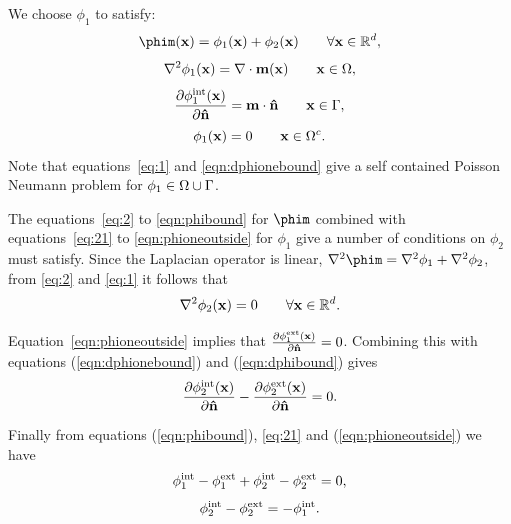 We choose $\phi_1$ to satisfy:
\begin{equation}
  \phim(\xv) = \phi_1(\xv) + \phi_2(\xv) \qquad \forall \xv \in \fulld,
  \label{eq:21}
\end{equation}
\begin{equation}
  \nabla^2 \phi_1(\mathbf{x}) = \nabla \cdot \mathbf{m}(\mathbf{x}) \qquad \mathbf{x} \in \Omega,
  \label{eq:1}
\end{equation}
\begin{equation}
  \frac{\partial \phi^{\text{int}}_1(\mathbf{x})}{\partial \mathbf{\hat{n}}} = \mathbf{m} \cdot \mathbf{\hat{n}} \qquad \mathbf{x} \in {\Gamma},
  \label{eqn:dphionebound}
\end{equation}
\begin{equation}
  \phi_1(\mathbf{x}) = 0 \qquad \mathbf{x} \in {\Omega^c}.
  \label{eqn:phioneoutside}
\end{equation}
Note that equations~\eqref{eq:1} and \eqref{eqn:dphionebound} give a self contained Poisson Neumann problem for $\phi_1 \in \Omega \cup {\Gamma}$.

The equations~\eqref{eq:2} to \eqref{eqn:phibound} for $\phim$ combined with equations~\eqref{eq:21} to \eqref{eqn:phioneoutside} for $\phi_1$ give a number of conditions on $\phi_2$ must satisfy. Since the Laplacian operator is linear, \ie $\lap \phim = \lap \phi_1 + \lap \phi_2$, from \eqref{eq:2} and \eqref{eq:1} it follows that
\begin{equation}
  \label{eq:8}
  \nabla^2 \phi_2(\mathbf{x}) = 0 \qquad \forall \mathbf{x} \in {\mathbb{R}^d}.
\end{equation}

Equation~\eqref{eqn:phioneoutside} implies that $\frac{\partial \phi^{\text{ext}}_1(\mathbf{x})}{\partial \mathbf{\hat{n}}} = 0$. Combining this with equations (\ref{eqn:dphionebound}) and (\ref{eqn:dphibound}) gives
\begin{equation}
  \label{eq:5}
  \frac{\partial \phi^{\text{int}}_2(\mathbf{x})}{\partial \mathbf{\hat{n}}} - \frac{\partial \phi^{\text{ext}}_2(\mathbf{x})}{\partial \mathbf{\hat{n}}} = 0.
\end{equation}

Finally from equations (\ref{eqn:phibound}), \eqref{eq:21} and (\ref{eqn:phioneoutside}) we have
\begin{equation*}
  \phi^{\text{int}}_1 - \phi^{\text{ext}}_1 + \phi^{\text{int}}_2 - \phi^{\text{ext}}_2 = 0,
\end{equation*}
\begin{equation}
  \phi^{\text{int}}_2 - \phi^{\text{ext}}_2 = - \phi^{\text{int}}_1.
\label{eq:4}
\end{equation}

